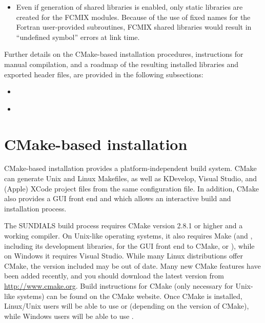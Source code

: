 \documentclass[letterpaper,10pt,english]{sphinxmanual}
\begin{document}
\begin{itemize}
\item {} 
Even if generation of shared libraries is enabled, only static
libraries are created for the FCMIX modules.  Because of the use of
fixed names for the Fortran user-provided subroutines, FCMIX shared
libraries would result in ``undefined symbol'' errors at link time.

\end{itemize}

Further details on the CMake-based installation procedures,
instructions for manual compilation, and a roadmap of the resulting
installed libraries and exported header files, are provided in the
following subsections:
\begin{itemize}
\item {} 
{\hyperref[Install:installation-cmake]{\emph{}}}

\item {} 
{\hyperref[Install:installation-results]{\emph{}}}

\end{itemize}


\section{CMake-based installation}
\label{Install:installation-cmake}\label{Install:cmake-based-installation}
CMake-based installation provides a platform-independent build system. CMake can generate
Unix and Linux Makefiles, as well as KDevelop, Visual Studio, and
(Apple) XCode project files from the same configuration file.
In addition, CMake also provides a GUI front end and which allows an interactive build and
installation process.

The SUNDIALS build process requires CMake version 2.8.1 or
higher and a working compiler.  On Unix-like operating systems, it
also requires Make (and , including its development libraries,
for the GUI front end to CMake,  or ), while on
Windows it requires Visual Studio.  While many Linux distributions offer CMake,
the version included may be out of date.  Many new CMake
features have been added recently, and you should download the latest
version from \href{http://www.cmake.org}{http://www.cmake.org}.  Build instructions for CMake
(only necessary for Unix-like systems) can be found on the CMake website.
Once CMake is installed, Linux/Unix users will be able to use
 or  (depending on the version of CMake),
while Windows users will be able to use .
\end{document}
